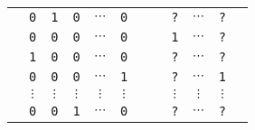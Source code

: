 \begin{table}[!h]
\setlength{\tabcolsep}{1pt} %
\begin{tabular}{|*{7}{c}|ccccc|} \hline
\rule{0em}{10pt}
& \texttt{0} & \texttt{1} & \texttt{0} & $\cdots$ & \texttt{0} & & & \texttt{?} & $\cdots$ & \texttt{?} & \\
& \texttt{0} & \texttt{0} & \texttt{0} & $\cdots$ & \texttt{0} & & & \texttt{1} & $\cdots$ & \texttt{?} & \\
& \texttt{1} & \texttt{0} & \texttt{0} & $\cdots$ & \texttt{0} & & & \texttt{?} & $\cdots$ & \texttt{?} & \\
\vspace{-5pt}
& \texttt{0} & \texttt{0} & \texttt{0} & $\cdots$ & \texttt{1} & & & \texttt{?} & $\cdots$ & \texttt{1} & \\
& $\vdots$ & $\vdots$ & $\vdots$ & $\vdots$ & $\vdots$ & & & $\vdots$ & $\vdots$ & $\vdots$ & \\
& \texttt{0} & \texttt{0} & \texttt{1} & $\cdots$ & \texttt{0} & & & \texttt{?} & $\cdots$ & \texttt{?} & \\ \hline
\end{tabular}
\end{table}
